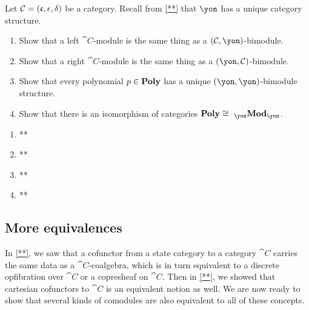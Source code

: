 \documentclass[Book-Poly]{subfiles}
\begin{document}
\begin{exercise}
Let $\mathcal{C}=(\mathfrak{c},\epsilon,\delta)$ be a category. Recall from \cref{**} that $\yon$ has a unique category structure.
\begin{enumerate}
	\item Show that a left $\cat{C}$-module is the same thing as a $(\cat{C},\yon)$-bimodule.
	\item Show that a right $\cat{C}$-module is the same thing as a $(\yon,\cat{C})$-bimodule.
	\item Show that every polynomial $p\in\mathbf{Poly}$ has a unique $(\yon,\yon)$-bimodule structure.
	\item Show that there is an isomorphism of categories $\poly\cong\bimod{\yon}{\yon}$.
\qedhere
\end{enumerate}
\begin{solution}
\begin{enumerate}
    \item **
    \item **
    \item **
    \item **
\end{enumerate}
\end{solution}
\end{exercise}

\subsection{More equivalences}

In \cref{**}, we saw that a cofunctor from a state category to a category $\cat{C}$ carries the same data as a $\cat{C}$-coalgebra, which is in turn equivalent to a discrete opfibration over $\cat{C}$ or a copresheaf on $\cat{C}$.
Then in \cref{**}, we showed that cartesian cofunctors to $\cat{C}$ is an equivalent notion as well.
We are now ready to show that several kinds of comodules are also equivalent to all of these concepts.
\end{document}
